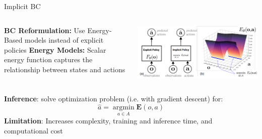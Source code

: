 \documentclass{beamer}
\begin{document}
\begin{frame}[t]{Implicit BC}
	\begin{columns}
        \hspace{1em}
		\begin{column}{0.5\textwidth}
            \textbf{BC Reformulation:} Use Energy-Based models instead of explicit policies \newline
            \newline
            \textbf{Energy Models:} Scalar energy function captures the relationship between states and actions
		\end{column}
		\begin{column}{0.5\textwidth}
            \begin{center}
                \includegraphics[width=\textwidth]{./img/ebm.png}
            \end{center}
		\end{column}
    \hspace{2em}
	\end{columns}
    \vspace{1em}
    \pause
    \textbf{Inference}: solve optimization problem (i.e. with gradient descent) for:
    \[
    \hat{a} = \mathop{\arg \min}\limits_{a \in A} \mathbf{E}(o,a)
    \]
    \pause
    \textbf{Limitation}: Increases complexity, training and inference time, and computational cost 

\end{frame}
\end{document}

